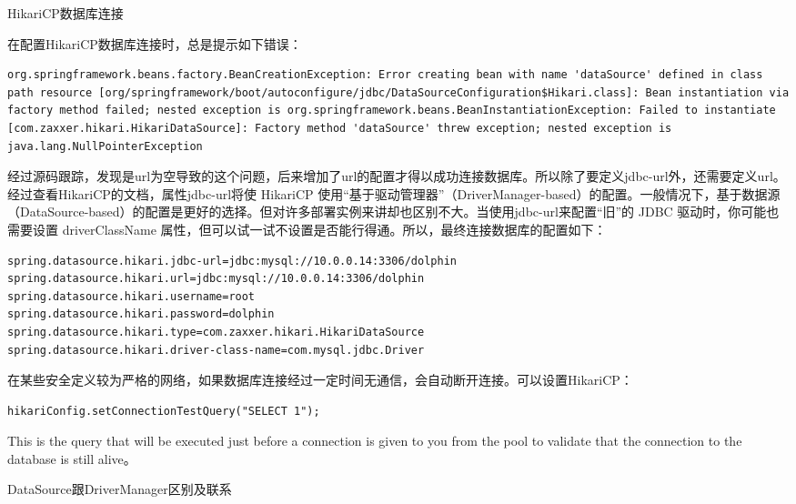 \documentclass[12pt]{book}
\makeatletter
\numberwithin{dummy}{section}
\theoremstyle{ocrenumbox}
\theoremstyle{blacknumex}
\theoremstyle{blacknumbox}
\theoremstyle{ocrenum}
\renewcommand{\subsection}{\@startsection {subsection}{2}{\z@}
	{-3ex \@plus -0.1ex \@minus -.4ex}
	{0.5ex \@plus.2ex }
	{\normalfont\sffamily\bfseries}}
\renewcommand\paragraph{\@startsection{paragraph}{4}{\z@}
	{-2ex \@plus-.2ex \@minus .2ex}
	{.1ex}
	{\normalfont\small\sffamily\bfseries}}
\makeatother
\begin{document}
\subsection{HikariCP数据库连接}

在配置HikariCP数据库连接时，总是提示如下错误：

\begin{lstlisting}
org.springframework.beans.factory.BeanCreationException: Error creating bean with name 'dataSource' defined in class path resource [org/springframework/boot/autoconfigure/jdbc/DataSourceConfiguration$Hikari.class]: Bean instantiation via factory method failed; nested exception is org.springframework.beans.BeanInstantiationException: Failed to instantiate [com.zaxxer.hikari.HikariDataSource]: Factory method 'dataSource' threw exception; nested exception is java.lang.NullPointerException
\end{lstlisting}

经过源码跟踪，发现是url为空导致的这个问题，后来增加了url的配置才得以成功连接数据库。所以除了要定义jdbc-url外，还需要定义url。经过查看HikariCP的文档，属性jdbc-url将使 HikariCP 使用“基于驱动管理器”（DriverManager-based）的配置。一般情况下，基于数据源（DataSource-based）的配置是更好的选择。但对许多部署实例来讲却也区别不大。当使用jdbc-url来配置“旧”的 JDBC 驱动时，你可能也需要设置 driverClassName 属性，但可以试一试不设置是否能行得通。所以，最终连接数据库的配置如下：

\begin{lstlisting}
spring.datasource.hikari.jdbc-url=jdbc:mysql://10.0.0.14:3306/dolphin
spring.datasource.hikari.url=jdbc:mysql://10.0.0.14:3306/dolphin
spring.datasource.hikari.username=root
spring.datasource.hikari.password=dolphin
spring.datasource.hikari.type=com.zaxxer.hikari.HikariDataSource
spring.datasource.hikari.driver-class-name=com.mysql.jdbc.Driver
\end{lstlisting}

在某些安全定义较为严格的网络，如果数据库连接经过一定时间无通信，会自动断开连接。可以设置HikariCP：

\begin{lstlisting}
hikariConfig.setConnectionTestQuery("SELECT 1");
\end{lstlisting}
        
This is the query that will be executed just before a connection is given to you from the pool to validate that the connection to the database is still alive。


\paragraph{DataSource跟DriverManager区别及联系}
\end{document}
